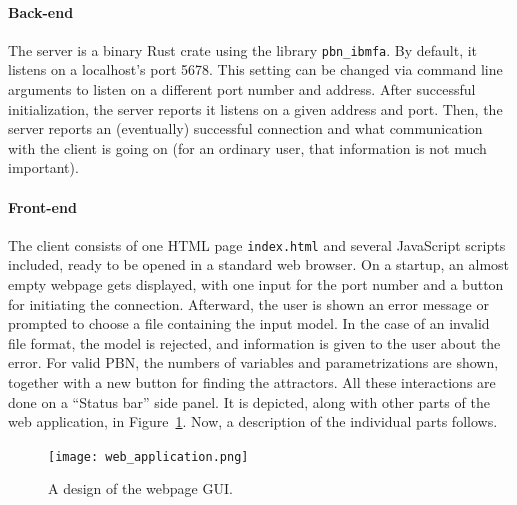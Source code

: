 \documentclass[
	digital, oneside, nosansbold, nocolorbold, nolot, nolof
]{fithesis4}
\theoremstyle{definition}
\theoremstyle{definition}
\begin{document}
\paragraph{Back-end}

The server is a binary Rust crate using the library \texttt{pbn\_ibmfa}. By
default, it listens on a localhost's port 5678. This setting can be changed via
command line arguments to listen on a different port number and address. After
successful initialization, the server reports it listens on a given address and
port. Then, the server reports an (eventually) successful connection and what
communication with the client is going on (for an ordinary user, that
information is not much important).

\paragraph{Front-end}

The client consists of one HTML page \verb|index.html| and several JavaScript
scripts included, ready to be opened in a standard web browser. On a startup,
an almost empty webpage gets displayed, with one input for the port number and
a button for initiating the connection. Afterward, the user is shown an error
message or prompted to choose a file containing the input model. In the case of
an invalid file format, the model is rejected, and information is given to the
user about the error. For valid PBN, the numbers of variables and
parametrizations are shown, together with a new button for finding the
attractors. All these interactions are done on a \enquote{Status bar} side
panel. It is depicted, along with other parts of the web application, in
Figure~\ref{fig:web_app}. Now, a description of the individual parts follows.

\begin{figure}[!ht]
\centering
\texttt{[image: web\_application.png]}
\caption{A design of the webpage GUI.}
\label{fig:web_app}
\end{figure}
\end{document}
